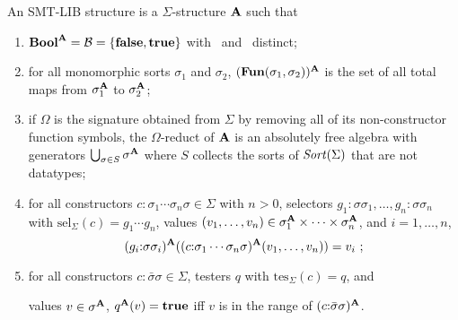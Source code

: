\begin{definition}
\label{def:structure}
An SMT-LIB structure is a $\Sigma$-structure $\mathbf{A}$ such that

\begin{enumerate}
\item $\textbf{Bool}^{\mathbf{A}} = \mathcal{B} = \{ \textbf{false}, \textbf{true} \}$ with \false\ and \true\ distinct;

\item for all monomorphic sorts $\sigma_1$ and $\sigma_2$,
  $(\textbf{Fun}(\sigma_1, \sigma_2))^{\mathbf{A}}$ is the set of all total maps from
  $\sigma_1^{\mathbf{A}}$ to $\sigma_2^{\mathbf{A}}$;


%

\item
if $\Omega$ is the signature obtained from $\Sigma$ by removing 
all of its non-constructor function symbols,
the $\Omega$-reduct of $\mathbf{A}$ is an absolutely free algebra with 
generators $\bigcup_{ \sigma \in S} \sigma^{\mathbf{A}}$
where $S$ collects the sorts of $\mathit{Sort}(\Sigma)$ that are not datatypes;

\item
for all constructors $c{:}\sigma_1\cdots\sigma_n\sigma \in \Sigma$ with $n>0$,
selectors $g_1{:}\sigma\sigma_1, \ldots, g_n{:}\sigma\sigma_n$ 
with $\mathrm{sel}_\Sigma(c) = g_1\cdots g_n$, 
values $(v_1, \ldots, v_n) \in \sigma_1^{\mathbf{A}} \times \cdots \times \sigma_n^{\mathbf{A}}$,
and
$i=1,\ldots,n$,
\[
 (g_i{:}\sigma\sigma_i)^{\str A}((c{:}\sigma_1\cdots\sigma_n\sigma)^{\str A}(v_1, \ldots, v_n)) = v_i\ ;
\]

\item
for all constructors $c{:}\bar{\sigma}\sigma \in \Sigma$,
testers $q$ with $\mathrm{tes}_\Sigma(c) = q$, and 
\begin{center}
  values $v \in \sigma^{\mathbf{A}}$,
 $q^{\mathbf{A}}(v) = \textbf{true}$ iff $v$ is in the range of $(c{:}\bar{\sigma}\sigma)^{\mathbf{A}}$.
\end{center}
\end{enumerate}
\end{definition}


